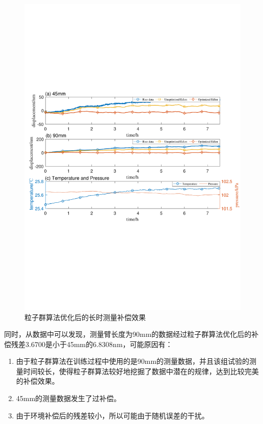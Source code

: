 \begin{figure}[htb]
  \centering
  \includegraphics[width=14cm]{fig/4-fig/edpso_长时测量实验数据.pdf}
  \caption{粒子群算法优化后的长时测量补偿效果}
  \label{fig:粒子群算法优化后的长时测量补偿效果}
\end{figure}

同时，从数据中可以发现，测量臂长度为90mm的数据经过粒子群算法优化后的补偿残差3.6700是小于45mm的6.8308nm，可能原因有：
\begin{enumerate}
  \item 由于粒子群算法在训练过程中使用的是90mm的测量数据，并且该组试验的测量时间较长，使得粒子群算法较好地挖掘了数据中潜在的规律，达到比较完美的补偿效果。
  \item 45mm的测量数据发生了过补偿。
  \item 由于环境补偿后的残差较小，所以可能由于随机误差的干扰。
\end{enumerate}

